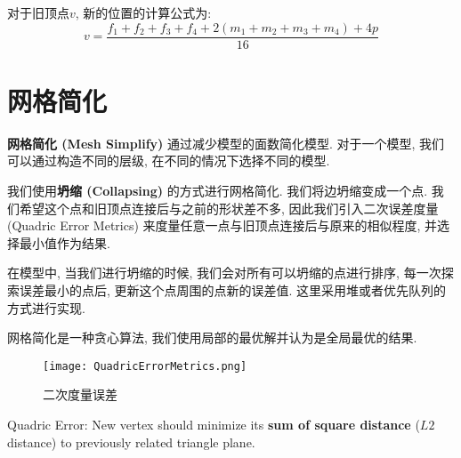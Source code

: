 对于旧顶点$v$, 新的位置的计算公式为: 
\begin{equation}
	v=\frac{f_1+f_2+f_3+f_4+2(m_1+m_2+m_3+m_4)+4p}{16}
\end{equation}

\section{网格简化}
\textbf{网格简化 (Mesh Simplify) }通过减少模型的面数简化模型. 对于一个模型, 我们可以通过构造不同的层级, 在不同的情况下选择不同的模型. 

我们使用\textbf{坍缩 (Collapsing) }的方式进行网格简化. 我们将边坍缩变成一个点. 我们希望这个点和旧顶点连接后与之前的形状差不多, 因此我们引入二次误差度量 (Quadric Error Metrics) 来度量任意一点与旧顶点连接后与原来的相似程度, 并选择最小值作为结果. 

在模型中, 当我们进行坍缩的时候, 我们会对所有可以坍缩的点进行排序, 每一次探索误差最小的点后, 更新这个点周围的点新的误差值. 这里采用堆或者优先队列的方式进行实现. 

网格简化是一种贪心算法, 我们使用局部的最优解并认为是全局最优的结果. 

\begin{figure}[H]
	\centering
	\texttt{[image: QuadricErrorMetrics.png]}
	\caption{二次度量误差}
	\label{fig:QuadricErrorMetrics}
\end{figure}

Quadric Error: New vertex should minimize its \textbf{sum of square distance} ($L2$ distance)
to previously related triangle plane.

